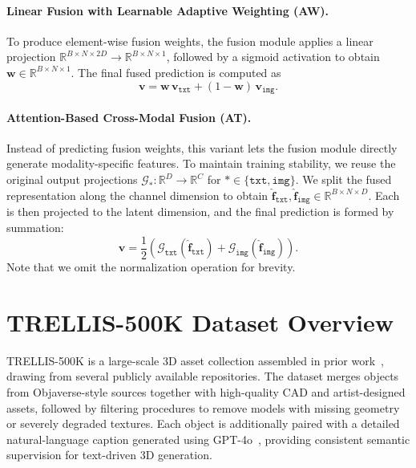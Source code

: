 \paragraph{Linear Fusion with Learnable Adaptive Weighting (AW).}
To produce element-wise fusion weights, the fusion module applies a linear projection 
$\mathbb{R}^{B\times N\times 2D} \rightarrow \mathbb{R}^{B\times N\times 1}$,
followed by a sigmoid activation to obtain 
$\mathbf{w} \in \mathbb{R}^{B\times N\times 1}$. 
The final fused prediction is computed as
\begin{equation}
    \mathbf{v}
    = \mathbf{w}\,\mathbf{v}_{\texttt{txt}}
    + (1-\mathbf{w})\,\mathbf{v}_{\texttt{img}}.
\end{equation}

\paragraph{Attention-Based Cross-Modal Fusion (AT).}
Instead of predicting fusion weights, this variant lets the fusion module directly generate modality-specific features. 
To maintain training stability, we reuse the original output projections 
$\mathcal{G}_{*} : \mathbb{R}^{D} \rightarrow \mathbb{R}^{C}$ for $* \in \{\texttt{txt}, \texttt{img}\}$. 
We split the fused representation along the channel dimension to obtain  
$\hat{\mathbf{f}}_{\texttt{txt}}, \hat{\mathbf{f}}_{\texttt{img}} \in \mathbb{R}^{B\times N\times D}$. 
Each is then projected to the latent dimension, and the final prediction is formed by summation:
\begin{equation}
    \mathbf{v}
    = \frac{1}{2}(\mathcal{G}_{\texttt{txt}}(\hat{\mathbf{f}}_{\texttt{txt}})
    + \mathcal{G}_{\texttt{img}}(\hat{\mathbf{f}}_{\texttt{img}})).
\end{equation}
Note that we omit the normalization operation for brevity.

\section{TRELLIS-500K Dataset Overview}

TRELLIS-500K is a large-scale 3D asset collection assembled in prior work~\cite{trellis}, drawing from several publicly available repositories. The dataset merges objects from Objaverse-style sources together with high-quality CAD and artist-designed assets, followed by filtering procedures to remove models with missing geometry or severely degraded textures. Each object is additionally paired with a detailed natural-language caption generated using GPT-4o~\cite{2024GPT4o}, providing consistent semantic supervision for text-driven 3D generation.

